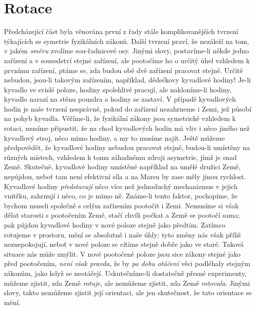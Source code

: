   \section{Rotace}
    Předcházející část byla věnována první z řady stále komplikovanějších tvrzení týkajících se 
    symetrie fyzikálních zákonů. Další tvrzení praví, že nezáleží na tom, v jakém \emph{směru} 
    zvolíme sou-řadnicové osy. Jinými slovy, postavíme-li někde jedno zařízení a v sousedství 
    stejné zařízení, ale pootočíme ho o určitý úhel vzhledem k prvnímu zařízení, ptáme se, zda 
    budou obě dvě zařízení pracovat stejně. Určitě nebudou, jsou-li takovým zařízením, například, 
    dědečkovy kyvadlové hodiny! Je-li kyvadlo ve svislé poloze, hodiny spolehlivě pracují, ale 
    nakloníme-li hodiny, kyvadlo narazí na stěnu pouzdra a hodiny se zastaví. V případě kyvadlových 
    hodin je naše tvrzení nesprávné, pokud do zařízení nezahrneme i Zemi, jež působí na pohyb 
    kyvadla. Věříme-li, že fyzikální zákony jsou symetrické vzhledem k rotaci, musíme připustit, že 
    na chod kyvadlových hodin má vliv i něco jiného než kyvadlový stroj, něco mimo hodiny, a my to 
    musíme najít. Ještě můžeme předpovědět, že kyvadlové hodiny nebudou pracovat stejně, budou-li 
    umístěny na různých místech, vzhledem k tomu záhadnému zdroji asymetrie, jímž je snad Země. 
    Skutečně, kyvadlové hodiny umístěné například na umělé družici Země, nepůjdou, neboť tam není 
    efektivní síla a na Marsu by zase měly jinou rychlost. Kyvadlové hodiny \emph{představují} něco 
    více než jednoduchý mechanizmus v jejich vnitřku, zahrnují i něco, co je mimo ně. Známe-li 
    tento faktor, pochopíme, že bychom museli společně s celým zařízením pootočit i Zemi. Nemusíme 
    si však dělat starosti s pootočením Země, stačí chvíli počkat a Země se pootočí sama; pak 
    půjdou kyvadlové hodiny v nové poloze stejně jako předtím. Zatímco rotujeme v prostoru, mění se 
    absolutně i naše úhly; tyto změny nás však příliš neznepokojují, neboť v nové poloze se cítíme 
    stejně dobře jako ve staré. Taková situace nás může zmýlit. V nové pootočené poloze jsou sice 
    zákony stejné jako před pootočením, \emph{není však pravda}, že by \emph{po dobu otáčení} věci 
    podléhaly stejným zákonům, jako když se neotáčejí. Uskutečníme-li dostatečně přesné 
    experimenty, můžeme zjistit, zda Země \emph{rotuje}, ale nemůžeme zjistit, zda Země 
    \emph{rotovala}. Jinými slovy, takto nemůžeme zjistit její orientaci, ale jen skutečnost, že 
    tato orientace se mění.

